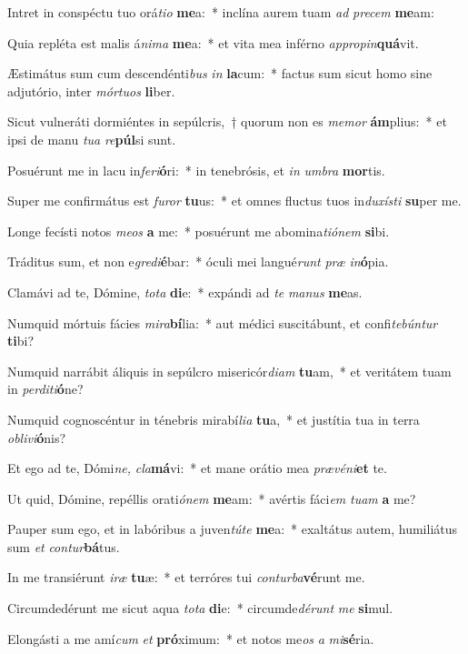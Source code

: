 \item Intret in conspéctu tuo orá\tinyhspace\textit{tio} \textbf{me}a:~* inclína aurem tuam \textit{ad} \textit{precem} \textbf{me}am:
\item Quia repléta est malis á\tinyhspace\textit{nima} \textbf{me}a:~* et vita mea inférno \textit{appropin}\textbf{quá}vit.
\item Æstimátus sum cum descendénti\textit{bus} \textit{in} \textbf{la}cum:~* factus sum sicut homo sine adjutório, inter \textit{mórtuos} \textbf{li}ber.
\item Sicut vulneráti dormiéntes in sepúlcris,~† quorum non es \textit{memor} \textbf{ám}plius:~* et ipsi de manu \textit{tua} \textit{re}\textbf{púl}si sunt.
\item Posuérunt me in lacu in\textit{feri}\textbf{ó}ri:~* in tenebrósis, et \textit{in} \textit{umbra} \textbf{mor}tis.
\item Super me confirmátus est \textit{furor} \textbf{tu}us:~* et omnes fluctus tuos in\tinyhspace\textit{duxísti} \textbf{su}per me.
\item Longe fecísti notos \textit{meos} \textbf{a} me:~* posuérunt me abomina\tinyhspace\textit{tiónem} \textbf{si}bi.
\item Tráditus sum, et non e\textit{gredi}\textbf{é}bar:~* óculi mei langué\textit{runt} \textit{præ} \textit{in}\textbf{ó}pia.
\item Clamávi ad te, Dómine, \textit{tota} \textbf{di}e:~* expándi ad \textit{te} \textit{manus} \textbf{me}as.
\item Numquid mórtuis fácies \textit{mira}\textbf{bí}lia:~* aut médici suscitábunt, et confi\tinyhspace\textit{tebúntur} \textbf{ti}bi?
\item Numquid narrábit áliquis in sepúlcro misericór\textit{diam} \textbf{tu}am,~* et veritátem tuam in \textit{perditi}\textbf{ó}ne?
\item Numquid cognoscéntur in ténebris mirabí\tinyhspace\textit{lia} \textbf{tu}a,~* et justítia tua in terra \textit{oblivi}\textbf{ó}nis?
\item Et ego ad te, Dómi\textit{ne,} \textit{cla}\textbf{má}vi:~* et mane orátio mea \textit{prævéni}\textbf{et} te.
\item Ut quid, Dómine, repéllis orati\tinyhspace\textit{ónem} \textbf{me}am:~* avértis fáci\tinyhspace\textit{em} \textit{tuam} \textbf{a} me?
\item Pauper sum ego, et in labóribus a juven\textit{túte} \textbf{me}a:~* exaltátus autem, humiliátus sum \textit{et} \textit{contur}\textbf{bá}tus.
\item In me transiérunt \textit{iræ} \textbf{tu}æ:~* et terróres tui \textit{conturba}\textbf{vé}runt me.
\item Circumdedérunt me sicut aqua \textit{tota} \textbf{di}e:~* circumde\spurhspace\textit{dérunt} \textit{me} \textbf{si}mul.
\item Elongásti a me amí\tinyhspace\textit{cum} \textit{et} \textbf{pró}ximum:~* et notos me\tinyhspace\textit{os} \textit{a} \textit{mi}\textbf{sé}ria.
